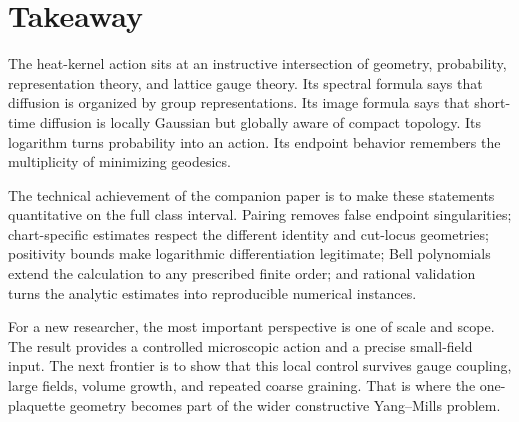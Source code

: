 \documentclass[11pt]{article}
\theoremstyle{definition}
\begin{document}
\section{Takeaway}

The heat-kernel action sits at an instructive intersection of geometry,
probability, representation theory, and lattice gauge theory.  Its spectral
formula says that diffusion is organized by group representations.  Its image
formula says that short-time diffusion is locally Gaussian but globally aware
of compact topology.  Its logarithm turns probability into an action.  Its
endpoint behavior remembers the multiplicity of minimizing geodesics.

The technical achievement of the companion paper is to make these statements
quantitative on the full class interval.  Pairing removes false endpoint
singularities; chart-specific estimates respect the different identity and
cut-locus geometries; positivity bounds make logarithmic differentiation
legitimate; Bell polynomials extend the calculation to any prescribed finite
order; and rational validation turns the analytic estimates into reproducible
numerical instances.

For a new researcher, the most important perspective is one of scale and
scope.  The result provides a controlled microscopic action and a precise
small-field input.  The next frontier is to show that this local control
survives gauge coupling, large fields, volume growth, and repeated coarse
graining.  That is where the one-plaquette geometry becomes part of the wider
constructive Yang--Mills problem.



\end{document}
